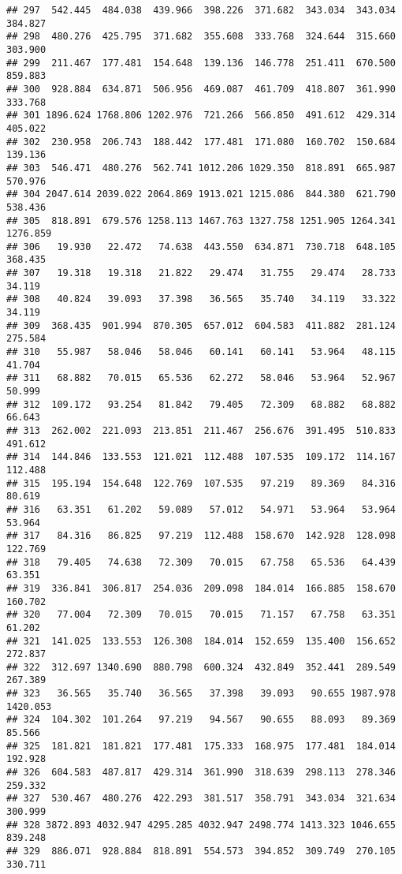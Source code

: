 \documentclass[
]{article}
\begin{document}
\begin{verbatim}
## 297  542.445  484.038  439.966  398.226  371.682  343.034  343.034  384.827
## 298  480.276  425.795  371.682  355.608  333.768  324.644  315.660  303.900
## 299  211.467  177.481  154.648  139.136  146.778  251.411  670.500  859.883
## 300  928.884  634.871  506.956  469.087  461.709  418.807  361.990  333.768
## 301 1896.624 1768.806 1202.976  721.266  566.850  491.612  429.314  405.022
## 302  230.958  206.743  188.442  177.481  171.080  160.702  150.684  139.136
## 303  546.471  480.276  562.741 1012.206 1029.350  818.891  665.987  570.976
## 304 2047.614 2039.022 2064.869 1913.021 1215.086  844.380  621.790  538.436
## 305  818.891  679.576 1258.113 1467.763 1327.758 1251.905 1264.341 1276.859
## 306   19.930   22.472   74.638  443.550  634.871  730.718  648.105  368.435
## 307   19.318   19.318   21.822   29.474   31.755   29.474   28.733   34.119
## 308   40.824   39.093   37.398   36.565   35.740   34.119   33.322   34.119
## 309  368.435  901.994  870.305  657.012  604.583  411.882  281.124  275.584
## 310   55.987   58.046   58.046   60.141   60.141   53.964   48.115   41.704
## 311   68.882   70.015   65.536   62.272   58.046   53.964   52.967   50.999
## 312  109.172   93.254   81.842   79.405   72.309   68.882   68.882   66.643
## 313  262.002  221.093  213.851  211.467  256.676  391.495  510.833  491.612
## 314  144.846  133.553  121.021  112.488  107.535  109.172  114.167  112.488
## 315  195.194  154.648  122.769  107.535   97.219   89.369   84.316   80.619
## 316   63.351   61.202   59.089   57.012   54.971   53.964   53.964   53.964
## 317   84.316   86.825   97.219  112.488  158.670  142.928  128.098  122.769
## 318   79.405   74.638   72.309   70.015   67.758   65.536   64.439   63.351
## 319  336.841  306.817  254.036  209.098  184.014  166.885  158.670  160.702
## 320   77.004   72.309   70.015   70.015   71.157   67.758   63.351   61.202
## 321  141.025  133.553  126.308  184.014  152.659  135.400  156.652  272.837
## 322  312.697 1340.690  880.798  600.324  432.849  352.441  289.549  267.389
## 323   36.565   35.740   36.565   37.398   39.093   90.655 1987.978 1420.053
## 324  104.302  101.264   97.219   94.567   90.655   88.093   89.369   85.566
## 325  181.821  181.821  177.481  175.333  168.975  177.481  184.014  192.928
## 326  604.583  487.817  429.314  361.990  318.639  298.113  278.346  259.332
## 327  530.467  480.276  422.293  381.517  358.791  343.034  321.634  300.999
## 328 3872.893 4032.947 4295.285 4032.947 2498.774 1413.323 1046.655  839.248
## 329  886.071  928.884  818.891  554.573  394.852  309.749  270.105  330.711

\end{verbatim}
\end{document}
